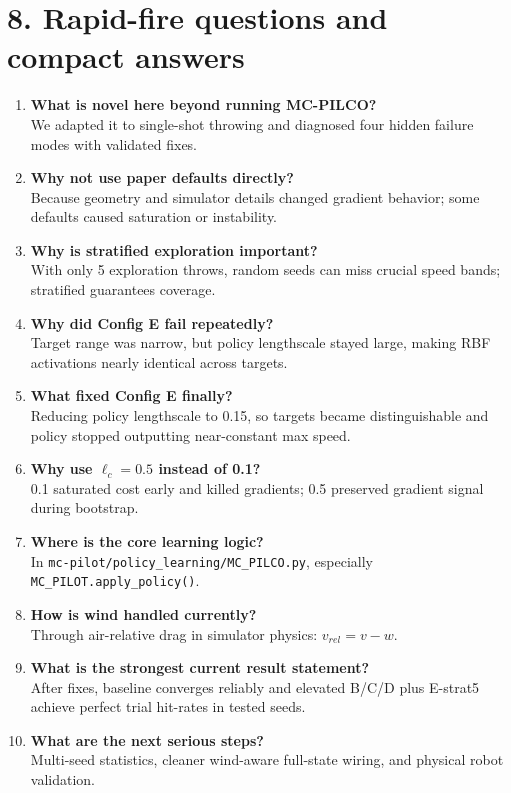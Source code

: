 \documentclass[11pt]{article}
\begin{document}
\section*{8. Rapid-fire questions and compact answers}
\begin{enumerate}
\item \textbf{What is novel here beyond running MC-PILCO?} \\
We adapted it to single-shot throwing and diagnosed four hidden failure modes with validated fixes.

\item \textbf{Why not use paper defaults directly?} \\
Because geometry and simulator details changed gradient behavior; some defaults caused saturation or instability.

\item \textbf{Why is stratified exploration important?} \\
With only 5 exploration throws, random seeds can miss crucial speed bands; stratified guarantees coverage.

\item \textbf{Why did Config E fail repeatedly?} \\
Target range was narrow, but policy lengthscale stayed large, making RBF activations nearly identical across targets.

\item \textbf{What fixed Config E finally?} \\
Reducing policy lengthscale to 0.15, so targets became distinguishable and policy stopped outputting near-constant max speed.

\item \textbf{Why use $\ell_c=0.5$ instead of 0.1?} \\
0.1 saturated cost early and killed gradients; 0.5 preserved gradient signal during bootstrap.

\item \textbf{Where is the core learning logic?} \\
In \texttt{mc-pilot/policy\_learning/MC\_PILCO.py}, especially \texttt{MC\_PILOT.apply\_policy()}.

\item \textbf{How is wind handled currently?} \\
Through air-relative drag in simulator physics: $v_{rel}=v-w$.

\item \textbf{What is the strongest current result statement?} \\
After fixes, baseline converges reliably and elevated B/C/D plus E-strat5 achieve perfect trial hit-rates in tested seeds.

\item \textbf{What are the next serious steps?} \\
Multi-seed statistics, cleaner wind-aware full-state wiring, and physical robot validation.
\end{enumerate}
\end{document}
